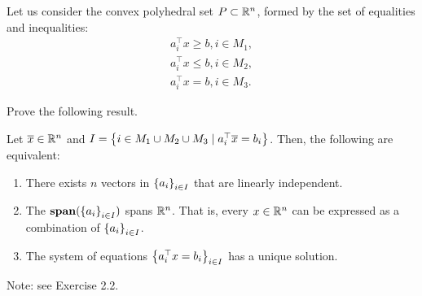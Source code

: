 Let us consider the convex polyhedral set $P \subset \mathbb{R}^n$, formed by the set of equalities and inequalities:
%
\begin{align*}
	a_i^\top x \geq b, i \in M_1, \\
	a_i^\top x \leq b, i \in M_2, \\
	a_i^\top x = b, i \in M_3.
\end{align*}
%

Prove the following result.

\begin{theorem*}
	Let $\overline{x} \in \mathbb{R}^n$ and $I = \left\{  i \in M_1 \cup M_2 \cup M_3 \mid a_i^\top \overline{x} = b_i \right \}$. Then, the following are equivalent:
	\begin{enumerate}
		\item There exists $n$ vectors in $\left\{ a_i \right \}_{i \in I}$ that are linearly independent.  
		\item The $\mathop{\bf span}(\left\{ a_i \right \}_{i \in I})$ spans $\mathbb{R}^n$. That is, every $x \in \mathbb{R}^n$ can be expressed as a combination of $\left\{ a_i \right \}_{i \in I}$.
		\item The system of equations $\left\{ a_i ^\top x = b_i \right \}_{i \in I}$ has a unique solution.
	\end{enumerate}
\end{theorem*}

Note: see Exercise 2.2.